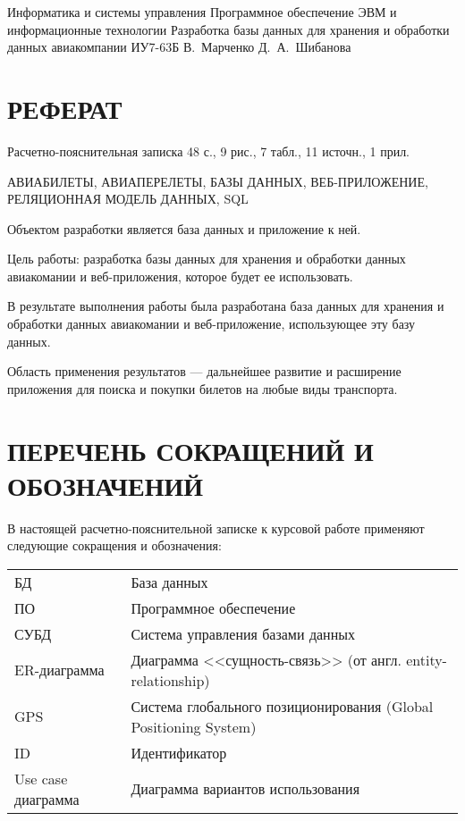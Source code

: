 \documentclass{bmstu}
\begin{document}
\makecourseworktitle
    {Информатика и системы управления}
    {Программное обеспечение ЭВМ и информационные технологии}
    {Разработка базы данных для хранения и обработки данных авиакомпании}
    {ИУ7-63Б}
    {В.~Марченко}
    {Д.~А.~Шибанова}
    {}
    {}
    
\setcounter{page}{3}

{\centering \chapter*{РЕФЕРАТ}}

Расчетно-пояснительная записка 48 с., 9 рис., 7 табл., 11 источн., 1 прил.

\noindent АВИАБИЛЕТЫ, АВИАПЕРЕЛЕТЫ, БАЗЫ ДАННЫХ, ВЕБ-ПРИЛОЖЕНИЕ, РЕЛЯЦИОННАЯ МОДЕЛЬ ДАННЫХ, SQL

Объектом разработки является база данных и приложение к ней.

Цель работы: разработка базы данных для хранения и обработки данных авиакомании и веб-приложения, которое будет ее использовать.

В результате выполнения работы была разработана база данных для хранения и обработки данных авиакомании и веб-приложение, использующее эту базу данных.

Область применения результатов --- дальнейшее развитие и расширение приложения для поиска и покупки билетов на любые виды транспорта.
    
\maketableofcontents

{\centering \chapter*{ПЕРЕЧЕНЬ СОКРАЩЕНИЙ И ОБОЗНАЧЕНИЙ}}

В настоящей расчетно-пояснительной записке к курсовой работе применяют следующие сокращения и обозначения:

\begin{table}[H]
\begin{tabular}{p{5cm}p{10.5cm}}
БД & База данных
\tabularnewline
ПО & Программное обеспечение
\tabularnewline
СУБД & Система управления базами данных
\tabularnewline
ER-диаграмма & Диаграмма <<сущность-связь>> (от англ. entity-relationship)
\tabularnewline
GPS & Система глобального позиционирования (Global Positioning System)
\tabularnewline
ID & Идентификатор
\tabularnewline
Use case диаграмма & Диаграмма вариантов использования
\tabularnewline
\end{tabular}
\end{table}
\end{document}
